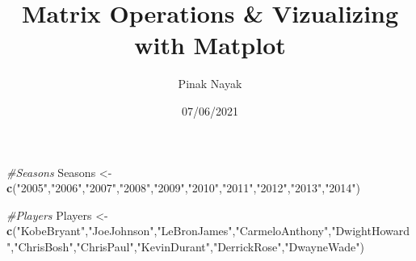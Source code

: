 \documentclass[
]{article}
\title{Matrix Operations \& Vizualizing with Matplot}
\author{Pinak Nayak}
\date{07/06/2021}
\newenvironment{Shaded}{\begin{snugshade}}{\end{snugshade}}
\newcommand{\CommentTok}[1]{\textcolor[rgb]{0.56,0.35,0.01}{\textit{#1}}}
\newcommand{\KeywordTok}[1]{\textcolor[rgb]{0.13,0.29,0.53}{\textbf{#1}}}
\newcommand{\NormalTok}[1]{#1}
\newcommand{\StringTok}[1]{\textcolor[rgb]{0.31,0.60,0.02}{#1}}
\begin{document}
\maketitle

\begin{Shaded}
\begin{Highlighting}[]
\CommentTok{#Seasons}
\NormalTok{Seasons <-}\StringTok{ }\KeywordTok{c}\NormalTok{(}\StringTok{"2005"}\NormalTok{,}\StringTok{"2006"}\NormalTok{,}\StringTok{"2007"}\NormalTok{,}\StringTok{"2008"}\NormalTok{,}\StringTok{"2009"}\NormalTok{,}\StringTok{"2010"}\NormalTok{,}\StringTok{"2011"}\NormalTok{,}\StringTok{"2012"}\NormalTok{,}\StringTok{"2013"}\NormalTok{,}\StringTok{"2014"}\NormalTok{)}

\CommentTok{#Players}
\NormalTok{Players <-}\StringTok{ }\KeywordTok{c}\NormalTok{(}\StringTok{"KobeBryant"}\NormalTok{,}\StringTok{"JoeJohnson"}\NormalTok{,}\StringTok{"LeBronJames"}\NormalTok{,}\StringTok{"CarmeloAnthony"}\NormalTok{,}\StringTok{"DwightHoward"}\NormalTok{,}\StringTok{"ChrisBosh"}\NormalTok{,}\StringTok{"ChrisPaul"}\NormalTok{,}\StringTok{"KevinDurant"}\NormalTok{,}\StringTok{"DerrickRose"}\NormalTok{,}\StringTok{"DwayneWade"}\NormalTok{)}


\end{Highlighting}
\end{Shaded}
\end{document}
